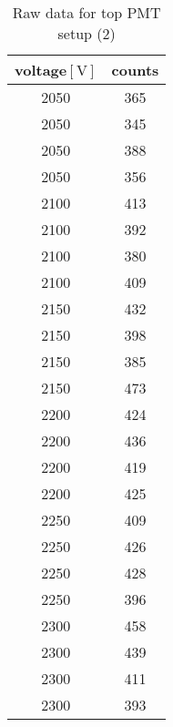\begin{table}[htpb]
	\centering
	\begin{tabular}{cc}
		\toprule
	voltage$[\si{\volt}]$ &  counts\\
	\midrule
\num{2050} & \num{ 365}\\
\num{2050} & \num{ 345}\\
\num{2050} & \num{ 388}\\
\num{2050} & \num{ 356}\\
\num{2100} & \num{ 413}\\
\num{2100} & \num{ 392}\\
\num{2100} & \num{ 380}\\
\num{2100} & \num{ 409}\\
\num{2150} & \num{ 432}\\
\num{2150} & \num{ 398}\\
\num{2150} & \num{ 385}\\
\num{2150} & \num{ 473}\\
\num{2200} & \num{ 424}\\
\num{2200} & \num{ 436}\\
\num{2200} & \num{ 419}\\
\num{2200} & \num{ 425}\\
\num{2250} & \num{ 409}\\
\num{2250} & \num{ 426}\\
\num{2250} & \num{ 428}\\
\num{2250} & \num{ 396}\\
\num{2300} & \num{ 458}\\
\num{2300} & \num{ 439}\\
\num{2300} & \num{ 411}\\
\num{2300} & \num{ 393}\\
\bottomrule
	\end{tabular}
	\caption{Raw data for top PMT setup (2)}
	\label{tab:raw_top}
\end{table}
